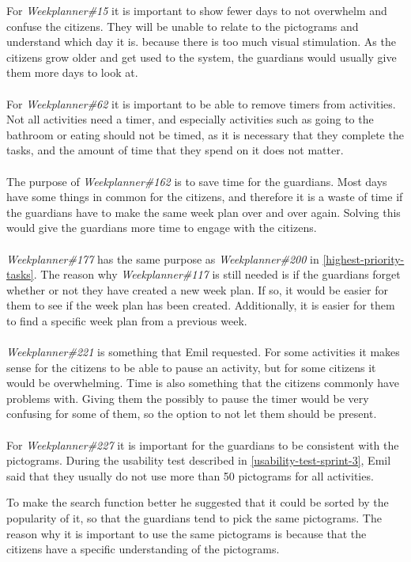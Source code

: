 For \textit{Weekplanner\#15} it is important to show fewer days to not overwhelm and confuse the citizens.
They will be unable to relate to the pictograms and understand which day it is. because there is too much visual stimulation.
As the citizens grow older and get used to the system, the guardians would usually give them more days to look at.
\\\\
For \textit{Weekplanner\#62} it is important to be able to remove timers from activities. 
Not all activities need a timer, and especially activities such as going to the bathroom or eating should not be timed, as it is necessary that they complete the tasks, and the amount of time that they spend on it does not matter.
\\\\
The purpose of \textit{Weekplanner\#162} is to save time for the guardians. 
Most days have some things in common for the citizens, and therefore it is a waste of time if the guardians have to make the same week plan over and over again.
Solving this would give the guardians more time to engage with the citizens.
\\\\
\textit{Weekplanner\#177} has the same purpose as \textit{Weekplanner\#200} in \autoref{highest-priority-tasks}. 
The reason why \textit{Weekplanner\#117} is still needed is if the guardians forget whether or not they have created a new week plan.
If so, it would be easier for them to see if the week plan has been created.
Additionally, it is easier for them to find a specific week plan from a previous week.
\\\\
\textit{Weekplanner\#221} is something that Emil requested. 
For some activities it makes sense for the citizens to be able to pause an activity, but for some citizens it would be overwhelming.
Time is also something that the citizens commonly have problems with. 
Giving them the possibly to pause the timer would be very confusing for some of them, so the option to not let them should be present.
\\\\
For \textit{Weekplanner\#227} it is important for the guardians to be consistent with the pictograms.
During the usability test described in \autoref{usability-test-sprint-3}, Emil said that they usually do not use more than 50 pictograms for all activities.

To make the search function better he suggested that it could be sorted by the popularity of it, so that the guardians tend to pick the same pictograms.
The reason why it is important to use the same pictograms is because that the citizens have a specific understanding of the pictograms.

